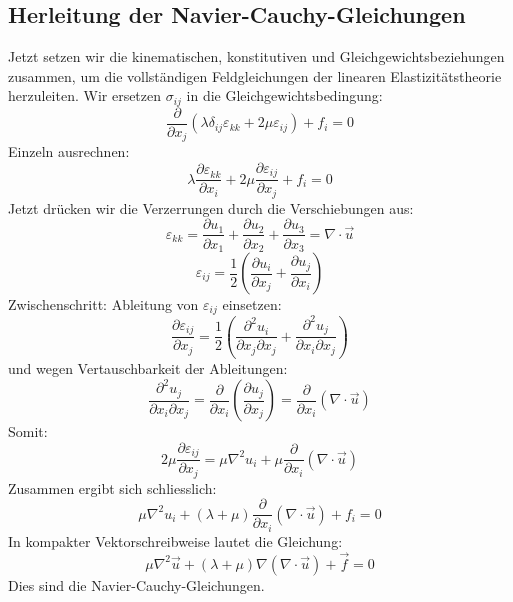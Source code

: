\subsection{Herleitung der Navier-Cauchy-Gleichungen}
Jetzt setzen wir die kinematischen, konstitutiven und Gleichgewichtsbeziehungen zusammen, um die vollständigen Feldgleichungen der linearen Elastizitätstheorie herzuleiten.
Wir ersetzen $\sigma_{ij}$ in die Gleichgewichtsbedingung:
	\begin{equation}
		\frac{\partial}{\partial x_j}\left( \lambda \delta_{ij} \varepsilon_{kk} + 2\mu \varepsilon_{ij} \right) + f_i = 
		0
	\end{equation}
Einzeln ausrechnen:
	\begin{equation}
		\lambda \frac{\partial \varepsilon_{kk}}{\partial x_i} + 2\mu \frac{\partial \varepsilon_{ij}}{\partial x_j} + f_i = 
		0
	\end{equation}
Jetzt drücken wir die Verzerrungen durch die Verschiebungen aus:
	\begin{equation}
		\varepsilon_{kk} = 
		\frac{\partial u_1}{\partial x_1} + \frac{\partial u_2}{\partial x_2} + \frac{\partial u_3}{\partial x_3} = 
		\nabla \cdot \vec{u}
	\end{equation}
	\begin{equation}
		\varepsilon_{ij} = 
		\frac{1}{2}\left( \frac{\partial u_i}{\partial x_j} + \frac{\partial 	u_j}{\partial x_i} \right)
	\end{equation}
Zwischenschritt: Ableitung von $\varepsilon_{ij}$ einsetzen:
	\begin{equation}
		\frac{\partial \varepsilon_{ij}}{\partial x_j} = 
		\frac{1}{2}\left( \frac{\partial^2 u_i}{\partial x_j \partial x_j} + \frac{\partial^2 u_j}{\partial x_i \partial x_j} \right)
	\end{equation}
und wegen Vertauschbarkeit der Ableitungen:
	\begin{equation}
		\frac{\partial^2 u_j}{\partial x_i \partial x_j} = 
		\frac{\partial}{\partial x_i}\left( \frac{\partial u_j}{\partial x_j} \right) = 	\frac{\partial}{\partial x_i}(\nabla \cdot \vec{u})
	\end{equation}
Somit:
	\begin{equation}
		2\mu \frac{\partial \varepsilon_{ij}}{\partial x_j} = 
		\mu \nabla^2 u_i + \mu 	\frac{\partial}{\partial x_i}(\nabla \cdot \vec{u})
	\end{equation}
Zusammen ergibt sich schliesslich:
	\begin{equation}
		\mu \nabla^2 u_i + (\lambda+\mu) \frac{\partial}{\partial x_i}(\nabla \cdot \vec{u}) + f_i = 
		0
	\end{equation}
In kompakter Vektorschreibweise lautet die Gleichung:
	\begin{equation}
		\mu \nabla^2 \vec{u} + (\lambda+\mu) \nabla (\nabla \cdot \vec{u}) + \vec{f} = 
		0
	\end{equation}
Dies sind die Navier-Cauchy-Gleichungen.
	
